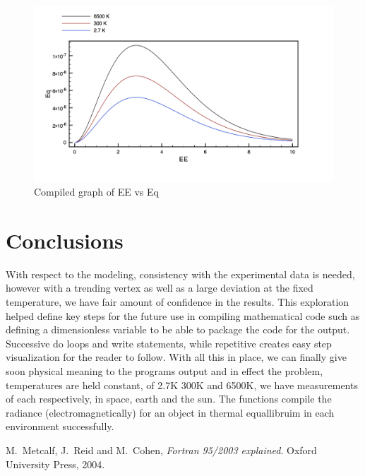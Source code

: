 \documentclass[12pt]{article}
\begin{document}
\begin{figure}[H]
	\centering 
	\includegraphics[width=1.\textwidth]{triple.png}
	\caption{Compiled graph of EE vs Eq}
\end{figure}



\section{Conclusions}

With respect to the modeling, consistency with the experimental data is needed, however with a trending vertex as well as a large deviation at the fixed temperature, we have fair amount of confidence in the results. This exploration helped define key steps for the future use in compiling mathematical code such as defining a dimensionless variable to be able to package the code for the output. Successive do loops and write statements, while repetitive creates easy step visualization for the reader to follow. With all this in place, we can finally give soon physical meaning to the programs output and in effect the problem, temperatures are held constant, of 2.7K 300K and 6500K, we have measurements of each respectively, in space, earth and the sun. The functions compile the radiance (electromagnetically) for an object in thermal equallibruim in each environment successfully.      


\begin{thebibliography}{}


 M.\ Metcalf, J.\ Reid and M.\ Cohen, {\it Fortran 95/2003 explained}. Oxford University Press, 2004.
 

\end{thebibliography}
\end{document}
